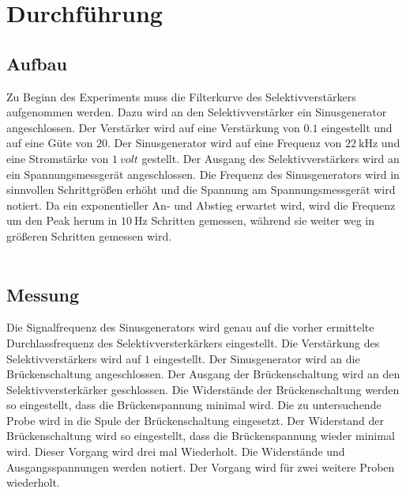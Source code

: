 \section{Durchführung}
\label{sec:Durchführung}

\subsection{Aufbau}
\label{sec:Aufbau}

Zu Beginn des Experiments muss die Filterkurve des Selektivverstärkers aufgenommen werden.
Dazu wird an den Selektivverstärker ein Sinusgenerator angeschlossen.
Der Verstärker wird auf eine Verstärkung von $0.1$ eingestellt und auf eine Güte von $20$.
Der Sinusgenerator wird auf eine Frequenz von $\SI{22}{\kilo\hertz}$ und eine Stromstärke von $\SI{1}{volt}$ gestellt.
Der Ausgang des Selektivverstärkers wird an ein Spannungsmessgerät angeschlossen.
Die Frequenz des Sinusgenerators wird in sinnvollen Schrittgrößen erhöht und die Spannung am Spannungsmessgerät wird notiert.
Da ein exponentieller An- und Abstieg erwartet wird, wird die Frequenz um den Peak herum in $\SI{10}{\hertz}$ Schritten gemessen,
während sie weiter weg in größeren Schritten gemessen wird.
\\
\\
\subsection{Messung}
\label{sec:Messung}

Die Signalfrequenz des Sinusgenerators wird genau auf die vorher ermittelte Durchlassfrequenz des Selektivversterkärkers eingestellt.
Die Verstärkung des Selektivverstärkers wird auf $1$ eingestellt.
Der Sinusgenerator wird an die Brückenschaltung angeschlossen. Der Ausgang der Brückenschaltung wird an den Selektivversterkärker geschlossen.
Die Widerstände der Brückenschaltung werden so eingestellt, dass die Brückenspannung minimal wird.
Die zu untersuchende Probe wird in die Spule der Brückenschaltung eingesetzt. 
Der Widerstand der Brückenschaltung wird so eingestellt, dass die Brückenspannung wieder minimal wird.
Dieser Vorgang wird drei mal Wiederholt. Die Widerstände und Ausgangsspannungen werden notiert.
Der Vorgang wird für zwei weitere Proben wiederholt.